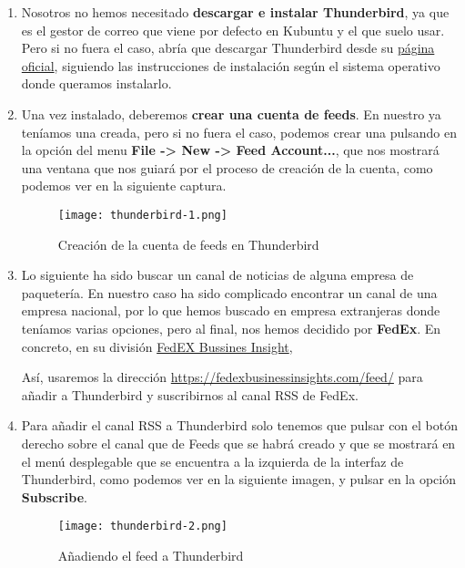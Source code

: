 \begin{enumerate}
    \item Nosotros no hemos necesitado \textbf{descargar e instalar Thunderbird}, ya que es el gestor de correo que viene por defecto en Kubuntu y el que suelo usar. Pero si no fuera el caso, abría que descargar Thunderbird desde su \href{https://www.thunderbird.net/es-ES/}{página oficial}, siguiendo las instrucciones de instalación según el sistema operativo donde queramos instalarlo.

    \item Una vez instalado, deberemos \textbf{crear una cuenta de feeds}. En nuestro ya teníamos una creada, pero si no fuera el caso, podemos crear una pulsando en la opción del menu \textbf{File -> New -> Feed Account...}, que nos mostrará una ventana que nos guiará por el proceso de creación de la cuenta, como podemos ver en la siguiente captura.

    \begin{figure}[H]
        \centering
        \texttt{[image: thunderbird-1.png]}
        \caption{Creación de la cuenta de feeds en Thunderbird}
    \end{figure}

    \item Lo siguiente ha sido buscar un canal de noticias de alguna empresa de paquetería. En nuestro caso ha sido complicado encontrar un canal de una empresa nacional, por lo que hemos buscado en empresa extranjeras donde teníamos varias opciones, pero al final, nos hemos decidido por \textbf{FedEx}. En concreto, en su división  \href{https://fedexbusinessinsights.com/}{FedEX Bussines Insight},

    Así, usaremos la dirección \url{https://fedexbusinessinsights.com/feed/} para añadir a Thunderbird y suscribirnos al canal RSS de FedEx.

    \item Para añadir el canal RSS a Thunderbird solo tenemos que pulsar con el botón derecho sobre el canal que de Feeds que se habrá creado y que se mostrará en el menú desplegable que se encuentra a la izquierda de la interfaz de Thunderbird, como podemos ver en la siguiente imagen, y pulsar en la opción \textbf{Subscribe}.

    \begin{figure}[H]
        \centering
        \texttt{[image: thunderbird-2.png]}
        \caption{Añadiendo el feed a Thunderbird}
    \end{figure}


\end{enumerate}
